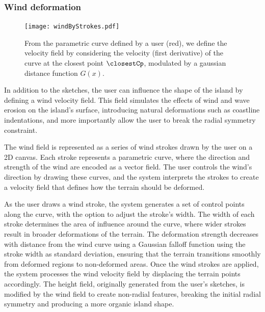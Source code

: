 \subsubsection{Wind deformation}
\label{sec:coral-island_wind-deformation}

\begin{figure}[H]
    \centering
    \texttt{[image: windByStrokes.pdf]}
    \caption{From the parametric curve defined by a user (red), we define the velocity field by considering the velocity (first derivative) of the curve at the closest point $\closestCp$, modulated by a gaussian distance function $G(x)$. }
    \label{fig:coral-island_wind-from-strokes}
\end{figure}

In addition to the sketches, the user can influence the shape of the island by defining a wind velocity field. This field simulates the effects of wind and wave erosion on the island's surface, introducing natural deformations such as coastline indentations, and more importantly allow the user to break the radial symmetry constraint.

The wind field is represented as a series of wind strokes drawn by the user on a 2D canvas. Each stroke represents a parametric curve, where the direction and strength of the wind are encoded as a vector field. The user controls the wind's direction by drawing these curves, and the system interprets the strokes to create a velocity field that defines how the terrain should be deformed.

As the user draws a wind stroke, the system generates a set of control points along the curve, with the option to adjust the stroke's width. The width of each stroke determines the area of influence around the curve, where wider strokes result in broader deformations of the terrain.
The deformation strength decreases with distance from the wind curve using a Gaussian falloff function using the stroke width as standard deviation, ensuring that the terrain transitions smoothly from deformed regions to non-deformed areas.
Once the wind strokes are applied, the system processes the wind velocity field by displacing the terrain points accordingly. The height field, originally generated from the user's sketches, is modified by the wind field to create non-radial features, breaking the initial radial symmetry and producing a more organic island shape.








